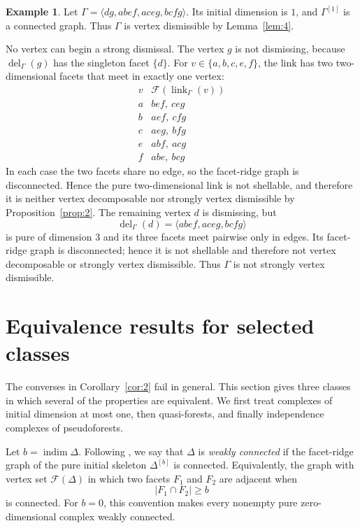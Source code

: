 \documentclass[11pt]{amsart}
\newcommand{\F}{\mathcal F}
\DeclareMathOperator{\indim}{indim}
\DeclareMathOperator{\link}{link}
\DeclareMathOperator{\del}{del}
\theoremstyle{definition}
\newtheorem{example}[theorem]{Example}
\begin{document}
	\begin{example}\label{ex:4}
		Let $\Gamma=\langle dg,abef,aceg,bcfg\rangle$. Its initial dimension is $1$, and $\Gamma^{[1]}$ is a connected graph. Thus $\Gamma$ is vertex dismissible by Lemma~\ref{lem:4}.
		
		No vertex can begin a strong dismissal.  The vertex $g$ is not dismissing, because $\del_\Gamma(g)$ has the singleton facet $\{d\}$.  For $v\in\{a,b,c,e,f\}$, the link has two two-dimensional facets that meet in exactly one vertex:
		\[
		\begin{array}{c|c}
			v & \F(\link_\Gamma(v))\\ \hline
			a & bef,\ ceg\\
			b & aef,\ cfg\\
			c & aeg,\ bfg\\
			e & abf,\ acg\\
			f & abe,\ bcg
		\end{array}
		\]
		In each case the two facets share no edge, so the facet-ridge graph is disconnected.  Hence the pure two-dimensional link is not shellable, and therefore it is neither vertex decomposable nor strongly vertex dismissible by Proposition~\ref{prop:2}.  The remaining vertex $d$ is dismissing, but
		\[
		\del_\Gamma(d)=\langle abef,aceg,bcfg\rangle
		\]
		is pure of dimension $3$ and its three facets meet pairwise only in edges. Its facet-ridge graph is disconnected; hence it is not shellable and therefore not vertex decomposable or strongly vertex dismissible.  Thus $\Gamma$ is not strongly vertex dismissible.
	\end{example}
	
	\section{Equivalence results for selected classes}
	\label{sec:5}
	
	The converses in Corollary~\ref{cor:2} fail in general.  This section gives three classes in which several of the properties are equivalent.  We first treat complexes of initial dimension at most one, then quasi-forests, and finally independence complexes of pseudoforests.
	
	Let $b=\indim\Delta$.  Following \cite{Namiq2026ICM}, we say that $\Delta$ is \emph{weakly connected} if the facet-ridge graph of the pure initial skeleton $\Delta^{[b]}$ is connected.  Equivalently, the graph with vertex set $\F(\Delta)$ in which two facets $F_1$ and $F_2$ are adjacent when
	\[
	|F_1\cap F_2|\geq b
	\]
	is connected.  For $b=0$, this convention makes every nonempty pure zero-dimensional complex weakly connected.
	
\end{document}
